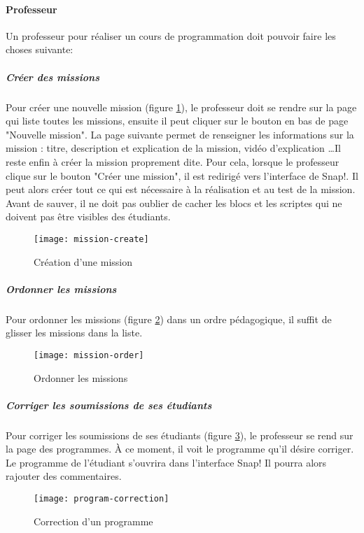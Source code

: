 \paragraph{Professeur}
Un professeur pour réaliser un cours de programmation doit pouvoir faire les choses suivante:
\subparagraph{Créer des missions} Pour créer une nouvelle mission (figure \ref{fig:mission-create}), le professeur doit se rendre sur la page qui liste toutes les missions, ensuite il peut cliquer sur le bouton en bas de page "Nouvelle mission". La page suivante permet de renseigner les informations sur la mission : titre, description et explication de la mission, vidéo d'explication \ldots Il reste enfin à créer la mission proprement dite. Pour cela, lorsque le professeur clique sur le bouton "Créer une mission", il est redirigé vers l'interface de Snap!. Il peut alors créer tout ce qui est nécessaire à la réalisation et au test de la mission. Avant de sauver, il ne doit pas oublier de cacher les blocs et les scriptes qui ne doivent pas être visibles des étudiants.
\begin{figure}
  \begin{center}
    \texttt{[image: mission-create]}
    \caption{Création d'une mission}
    \label{fig:mission-create}
  \end{center}
\end{figure}

\subparagraph{Ordonner les missions} Pour ordonner les missions (figure \ref{fig:mission-order}) dans un ordre pédagogique, il suffit de glisser les missions dans la liste.
\begin{figure}
  \begin{center}
    \texttt{[image: mission-order]}
    \caption{Ordonner les missions}
    \label{fig:mission-order}
  \end{center}
\end{figure}

\subparagraph{Corriger les soumissions de ses étudiants} Pour corriger les soumissions de ses étudiants (figure \ref{fig:program-correction}), le professeur se rend sur la page des programmes. À ce moment, il voit le programme qu'il désire corriger. Le programme de l'étudiant s'ouvrira dans l'interface Snap! Il pourra alors rajouter des commentaires.
\begin{figure}
  \begin{center}
    \texttt{[image: program-correction]}
    \caption{Correction d'un programme}
    \label{fig:program-correction}
  \end{center}
\end{figure}

